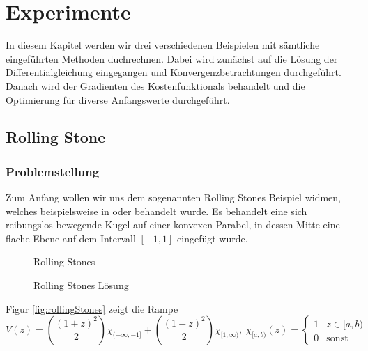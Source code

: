 \chapter{Experimente}
In diesem Kapitel werden wir drei verschiedenen Beispielen mit sämtliche eingeführten Methoden duchrechnen. Dabei wird zunächst auf die Lösung der Differentialgleichung eingegangen und Konvergenzbetrachtungen durchgeführt. Danach wird der Gradienten des Kostenfunktionals behandelt und die Optimierung für diverse Anfangswerte durchgeführt. %
\section{Rolling Stone}
\subsection{Problemstellung}
Zum Anfang wollen wir uns dem sogenannten Rolling Stones Beispiel widmen, welches beispielsweise in \cite{boeck2014experiments} oder \cite{hasenfelder13} behandelt wurde. 
Es behandelt eine sich reibungslos bewegende Kugel auf einer konvexen Parabel, in dessen Mitte eine flache Ebene auf dem Intervall $[-1,1]$ eingefügt wurde. 
\begin{figure}[ht]
\centering
\begin{minipage}[b]{0.49\linewidth}

\caption{Rolling Stones}
\label{fig:rollingStones}
\end{minipage}
\begin{minipage}[b]{0.49\linewidth}

\caption{Rolling Stones Lösung}
\label{fig:rollingStonesSolution}
\end{minipage}
\end{figure}
Figur \ref{fig:rollingStones} zeigt die Rampe
\[
 V(z) = \left(\frac{(1+z)^2}{2}\right)\chi_{(-\infty,-1]} + \left(\frac{(1-z)^2}{2}\right)\chi_{[1,\infty)} ,
 ~ \chi_{[a,b)}(z) = 
 \begin{cases}
  1 & z \in [a,b)\\
  0 & \text{sonst}
 \end{cases}
\]

